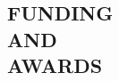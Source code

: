 \documentclass[margin,line]{res}
\begin{document}
\begin{resume}

















\medskip
\section{\bf FUNDING\\AND\\AWARDS}



\end{resume}
\end{document}
